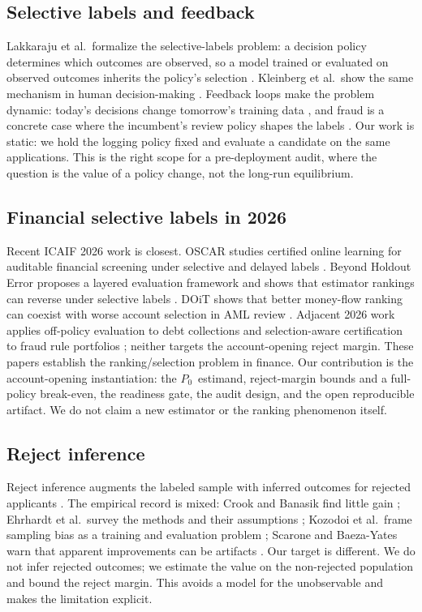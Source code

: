 \documentclass[conference]{IEEEtran}
\newcommand{\Pzero}{\ensuremath{P_0}}
\begin{document}
\subsection{Selective labels and feedback}
Lakkaraju et al.\ formalize the selective-labels problem: a decision policy determines which outcomes are observed, so a model trained or evaluated on observed outcomes inherits the policy's selection \cite{lakkaraju2017selective}. Kleinberg et al.\ show the same mechanism in human decision-making \cite{kleinberg2018human}. Feedback loops make the problem dynamic: today's decisions change tomorrow's training data \cite{ensign2018runaway,perdomo2020performative}, and fraud is a concrete case where the incumbent's review policy shapes the labels \cite{pombal2022prisoners}. Our work is static: we hold the logging policy fixed and evaluate a candidate on the same applications. This is the right scope for a pre-deployment audit, where the question is the value of a policy change, not the long-run equilibrium.

\subsection{Financial selective labels in 2026}
Recent ICAIF 2026 work is closest. OSCAR studies certified online learning for auditable financial screening under selective and delayed labels \cite{kuroki2026oscar}. Beyond Holdout Error proposes a layered evaluation framework and shows that estimator rankings can reverse under selective labels \cite{bhola2026}. DOiT shows that better money-flow ranking can coexist with worse account selection in AML review \cite{hong2026doit}. Adjacent 2026 work applies off-policy evaluation to debt collections \cite{prado2026jubilee} and selection-aware certification to fraud rule portfolios \cite{pande2026selection}; neither targets the account-opening reject margin. These papers establish the ranking/selection problem in finance. Our contribution is the account-opening instantiation: the \Pzero\ estimand, reject-margin bounds and a full-policy break-even, the readiness gate, the audit design, and the open reproducible artifact. We do not claim a new estimator or the ranking phenomenon itself.

\subsection{Reject inference}
Reject inference augments the labeled sample with inferred outcomes for rejected applicants \cite{boyes1989econometric}. The empirical record is mixed: Crook and Banasik find little gain \cite{crook2004reject}; Ehrhardt et al.\ survey the methods and their assumptions \cite{ehrhardt2021reject}; Kozodoi et al.\ frame sampling bias as a training and evaluation problem \cite{kozodoi2025fighting}; Scarone and Baeza-Yates warn that apparent improvements can be artifacts \cite{scarone2026illusion}. Our target is different. We do not infer rejected outcomes; we estimate the value on the non-rejected population and bound the reject margin. This avoids a model for the unobservable and makes the limitation explicit.
\end{document}
